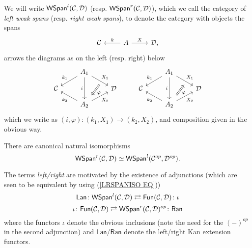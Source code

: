 \documentclass[a4paper,10pt]{article}%
\begin{document}
\begin{definition}\label{WSPAN DEF}
We will write 
$\mathsf{WSpan}^l(\mathcal{C},\mathcal{D})$
(resp.
$\mathsf{WSpan}^r(\mathcal{C},\mathcal{D})$),
which we call the category of  \textit{left weak spans} (resp. \textit{right weak spans}),
to denote the category with objects the spans
\[
\begin{tikzcd}
\C & A \ar{l}[swap]{k} \ar{r}{X} & \D,
\end{tikzcd}
\]
arrows the diagrams as on the left (resp. right) below \begin{equation}\label{TWISTEDARROWRIGHT EQ}
	\begin{tikzcd}[row sep=small]
	&
	A_1 \ar{dl}[swap,name=k1]{k_1} \ar{dr}[name=F11]{X_1} \ar{dd}[swap]{i} & &
	&
	A_1 \ar{dl}[swap,name=k1]{k_1} \ar{dr}[name=F1]{X_1} \ar{dd}[swap]{i} 
\\
	\C & & \D &
	\C & & \D 
\\
		& |[alias=G21]| A_2  \ar{ul}{k_2} \ar{ur}[swap]{X_2} & &
		& |[alias=G2]| A_2  \ar{ul}{k_2} \ar{ur}[swap]{X_2} &
		\arrow[Leftarrow, from=F1, to=G2,shorten >=0.25cm,shorten <=0.25cm,"\varphi"]
		\arrow[Rightarrow, from=F11, to=G21,shorten >=0.25cm,shorten <=0.25cm,"\varphi"]
	\end{tikzcd}
\end{equation}
which we write as $(i,\varphi) \colon (k_1,X_1) \to (k_2,X_2)$, and composition given in the obvious way.
\end{definition}


\begin{remark}
There are canonical natural isomorphisms
\begin{equation}\label{LRSPANISO EQ}
\mathsf{WSpan}^r(\mathcal{C},\mathcal{D}) \simeq \mathsf{WSpan}^l(\mathcal{C}^{op},\mathcal{D}^{op}).
\end{equation}
\end{remark}


\begin{remark}\label{RANLANADJ REM}
The terms \textit{left/right} are motivated by the existence of adjunctions (which are seen to be equivalent by using (\ref{LRSPANISO EQ}))
\[
	\mathsf{Lan} \colon
	\mathsf{WSpan}^l(\mathcal{C}, \mathcal{D})
		\rightleftarrows
	\mathsf{Fun}(\mathcal{C}, \mathcal{D})
	\colon \iota
\]
\[
	\iota \colon 
	\mathsf{Fun}(\mathcal{C}, \mathcal{D})
		\rightleftarrows
	\mathsf{WSpan}^r(\mathcal{C}, \mathcal{D})^{op}
	\colon \mathsf{Ran}
\]
where the functors $\iota$ denote the obvious inclusions 
(note the need for the $(\minus)^{op}$ in the second adjunction) 
and $\mathsf{Lan}$/$\mathsf{Ran}$ denote the left/right Kan extension functors.
\end{remark}
\end{document}
